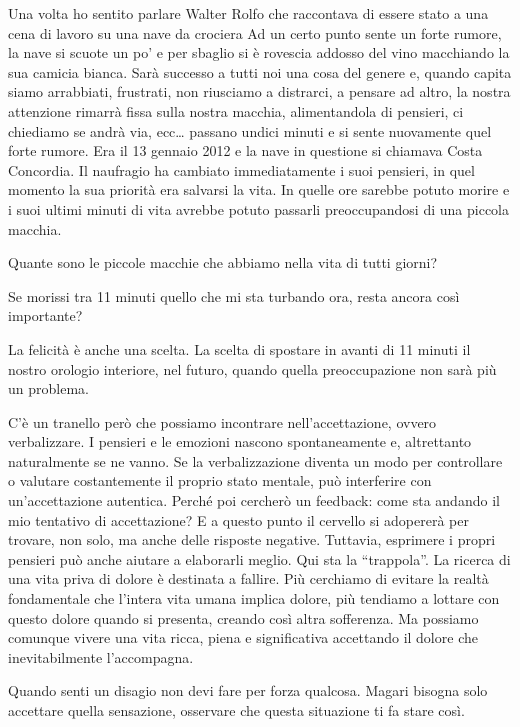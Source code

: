 \documentclass[12pt]{book} %
\begin{document}
Una volta ho sentito parlare Walter Rolfo che raccontava di essere stato a una cena di lavoro su una nave da crociera Ad
un certo punto sente un forte rumore, la nave si scuote un po' e per sbaglio si è rovescia addosso del vino macchiando
la sua camicia bianca. Sarà successo a tutti noi una cosa del genere e, quando capita siamo arrabbiati, frustrati, non
riusciamo a distrarci, a pensare ad altro, la nostra attenzione rimarrà fissa sulla nostra macchia, alimentandola di
pensieri, ci chiediamo se andrà via, ecc… passano undici minuti e si sente nuovamente quel forte rumore. Era il 13
gennaio 2012 e la nave in questione si chiamava Costa Concordia. Il naufragio ha cambiato immediatamente i suoi
pensieri, in quel momento la sua priorità era salvarsi la vita. In quelle ore sarebbe potuto morire e i suoi ultimi
minuti di vita avrebbe potuto passarli preoccupandosi di una piccola macchia.

Quante sono le piccole macchie che abbiamo nella vita di tutti giorni?

Se morissi tra 11 minuti quello che mi sta turbando ora, resta ancora così importante?

La felicità è anche una scelta. La scelta di spostare in avanti di 11 minuti il nostro orologio
interiore, nel futuro, quando quella preoccupazione non sarà più un problema.

C'è un tranello però che possiamo incontrare nell'accettazione, ovvero verbalizzare. I pensieri e
le emozioni nascono spontaneamente e, altrettanto naturalmente se ne vanno. Se la verbalizzazione diventa un modo per controllare o valutare costantemente il proprio stato mentale, può interferire con un’accettazione autentica. Perché poi cercherò un feedback: come sta andando il mio tentativo di accettazione? E a questo punto il cervello si adopererà per trovare, non solo, ma anche
delle risposte negative. Tuttavia, esprimere i propri pensieri può anche aiutare a elaborarli meglio. Qui sta la “trappola”. La ricerca di una vita priva di dolore è destinata a fallire. Più
cerchiamo di evitare la realtà fondamentale che l'intera vita umana implica dolore, più tendiamo a
lottare con questo dolore quando si presenta, creando così altra sofferenza. Ma possiamo comunque vivere una vita
ricca, piena e significativa accettando il dolore che inevitabilmente l'accompagna.

Quando senti un disagio non devi fare per forza qualcosa. Magari bisogna solo accettare quella sensazione, osservare che
questa situazione ti fa stare così.
\end{document}
